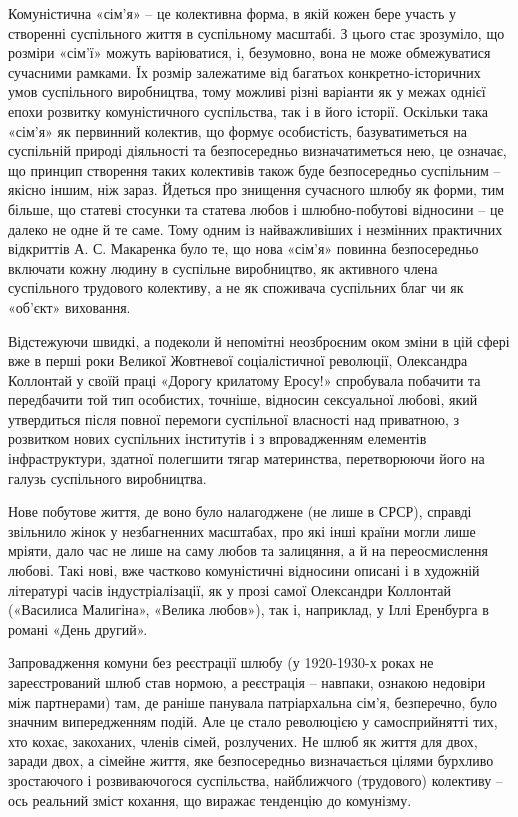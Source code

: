 \documentclass[12pt,a4paper,openany]{book}
\begin{document}
Комуністична «сім’я» – це колективна форма, в якій кожен бере участь у створенні суспільного життя в суспільному масштабі. З цього стає зрозуміло, що розміри «сім’ї» можуть варіюватися, і, безумовно, вона не може обмежуватися сучасними рамками. Їх розмір залежатиме від багатьох конкретно-історичних умов суспільного виробництва, тому можливі різні варіанти як у межах однієї епохи розвитку комуністичного суспільства, так і в його історії. Оскільки така «сім’я» як первинний колектив, що формує особистість, базуватиметься на суспільній природі діяльності та безпосередньо визначатиметься нею, це означає, що принцип створення таких колективів також буде безпосередньо суспільним – якісно іншим, ніж зараз. Йдеться про знищення сучасного шлюбу як форми, тим більше, що статеві стосунки та статева любов і шлюбно-побутові відносини – це далеко не одне й те саме. Тому одним із найважливіших і незмінних практичних відкриттів А. С. Макаренка було те, що нова «сім’я» повинна безпосередньо включати кожну людину в суспільне виробництво, як активного члена суспільного трудового колективу, а не як споживача суспільних благ чи як «об’єкт» виховання.

Відстежуючи швидкі, а подеколи й непомітні неозброєним оком зміни в цій сфері вже в перші роки Великої Жовтневої соціалістичної революції, Олександра Коллонтай у своїй праці «Дорогу крилатому Еросу!» спробувала побачити та передбачити той тип особистих, точніше, відносин сексуальної любові, який утвердиться після повної перемоги суспільної власності над приватною, з розвитком нових суспільних інститутів і з впровадженням елементів інфраструктури, здатної полегшити тягар материнства, перетворюючи його на галузь суспільного виробництва.

Нове побутове життя, де воно було налагоджене (не лише в СРСР), справді звільнило жінок у незбагненних масштабах, про які інші країни могли лише мріяти, дало час не лише на саму любов та залицяння, а й на переосмислення любові. Такі нові, вже частково комуністичні відносини описані і в художній літературі часів індустріалізації, як у прозі самої Олександри Коллонтай («Василиса Малигіна», «Велика любов»), так і, наприклад, у Іллі Еренбурга в романі «День другий».

Запровадження комуни без реєстрації шлюбу (у 1920-1930-х роках не зареєстрований шлюб став нормою, а реєстрація – навпаки, ознакою недовіри між партнерами) там, де раніше панувала патріархальна сім’я, безперечно, було значним випередженням подій. Але це стало революцією у самосприйнятті тих, хто кохає, закоханих, членів сімей, розлучених. Не шлюб як життя для двох, заради двох, а сімейне життя, яке безпосередньо визначається цілями бурхливо зростаючого і розвиваючогося суспільства, найближчого (трудового) колективу – ось реальний зміст кохання, що виражає тенденцію до комунізму.
\end{document}
